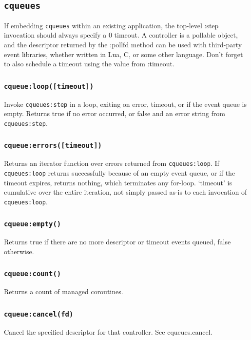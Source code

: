 \documentclass[11pt, oneside]{memoir}
\newcommand*{\cqueues}[0]{\texttt{cqueues}\xspace}
\newcommand*{\routine}[1]{\texttt{#1}\xspace}
\newcommand*{\method}[1]{\texttt{#1}\xspace}
\newcounter{toccols}
\newenvironment{Module}[1]{
	\subsection{\texttt{#1}}
	\addtocontents{toc}{
		\protect\begin{multicols}{\value{toccols}}
	}
}{
	\addtocontents{toc}{\protect\end{multicols}}
}
\begin{document}
\begin{Module}{\cqueues}
If embedding \cqueues within an existing application, the top-level :step invocation should always specify a 0 timeout. A controller is a pollable object, and the descriptor returned by the :pollfd method can be used with third-party event libraries, whether written in Lua, C, or some other language. Don't forget to also schedule a timeout using the value from :timeout.


\subsubsection[\routine{cqueues:loop}]{\routine{cqueue:loop([timeout])}}

Invoke \method{cqueues:step} in a loop, exiting on error, timeout, or if the event queue is empty. Returns true if no error occurred, or false and an error string from \method{cqueues:step}.

\subsubsection[\routine{cqueues:errors}]{\routine{cqueue:errors([timeout])}}

Returns an iterator function over errors returned from \routine{cqueues:loop}. If \routine{cqueues:loop} returns successfully because of an empty event queue, or if the timeout expires, returns nothing, which terminates any for-loop. `timeout' is cumulative over the entire iteration, not simply passed as-is to each invocation of \routine{cqueues:loop}.

\subsubsection[\routine{cqueues:empty}]{\routine{cqueue:empty()}}
Returns true if there are no more descriptor or timeout events queued, false otherwise.

\subsubsection[\routine{cqueues:count}]{\routine{cqueue:count()}}
Returns a count of managed coroutines.

\subsubsection[\routine{cqueues:cancel}]{\routine{cqueue:cancel(fd)}}
Cancel the specified descriptor for that controller. See cqueues.cancel.


\end{Module}
\end{document}
